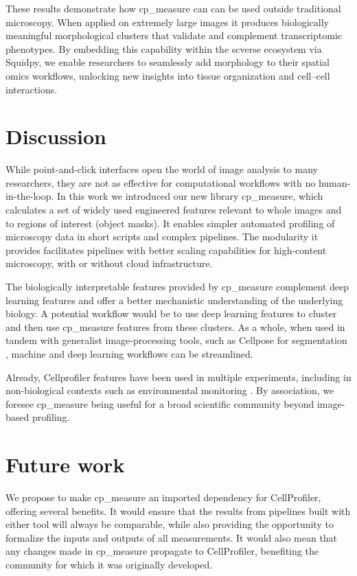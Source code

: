 \documentclass{article}
\begin{document}
These results demonstrate how cp\_measure can can be used outside traditional microscopy. When applied on extremely large images it produces biologically meaningful morphological clusters that validate and complement transcriptomic phenotypes. By embedding this capability within the scverse ecosystem via Squidpy, we enable researchers to seamlessly add morphology to their spatial omics workflows, unlocking new insights into tissue organization and cell–cell interactions.

\section{Discussion}
\label{sec:orgf37b369}
While point-and-click interfaces open the world of image analysis to many researchers, they are not as effective for computational workflows with no human-in-the-loop. In this work we introduced our new library cp\_measure, which calculates a set of widely used engineered features relevant to whole images and to regions of interest (object masks). It enables simpler automated profiling of microscopy data in short scripts and complex pipelines. The modularity it provides facilitates pipelines with better scaling capabilities for high-content microscopy, with or without cloud infrastructure.

The biologically interpretable features provided by cp\_measure complement deep learning features and offer a better mechanistic understanding of the underlying biology. A potential workflow would be to use deep learning features to cluster and then use cp\_measure features from these clusters. As a whole, when used in tandem with generalist image-processing tools, such as Cellpose for segmentation \cite{stringerCellposeGeneralistAlgorithm2021}, machine and deep learning workflows can be streamlined. 

Already, Cellprofiler features have been used in multiple experiments, including in non-biological contexts such as environmental monitoring \citep{ideharaExploringNileRed2025}. By association, we foresee cp\_measure being useful for a broad scientific community beyond image-based profiling.
\section{Future work}
\label{sec:org5cdbb12}
We propose to make cp\_measure an imported dependency for CellProfiler, offering several benefits. It would ensure that the results from pipelines built with either tool will always be comparable, while also providing the opportunity to formalize the inputs and outputs of all measurements. It would also mean that any changes made in cp\_measure propagate to CellProfiler, benefiting the community for which it was originally developed.
\end{document}
